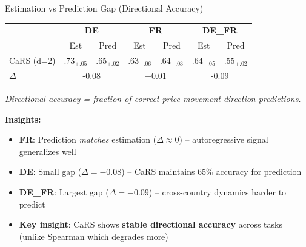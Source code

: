 \documentclass[aspectratio=169]{beamer}
\begin{document}
\begin{frame}{Estimation vs Prediction Gap (Directional Accuracy)}
\begin{table}
\centering
\small
\begin{tabular}{l|cc|cc|cc}
\toprule
& \multicolumn{2}{c|}{\textbf{DE}} & \multicolumn{2}{c|}{\textbf{FR}} & \multicolumn{2}{c}{\textbf{DE\_FR}} \\
& Est & Pred & Est & Pred & Est & Pred \\
\midrule
CaRS (d=2) & .73$_{\pm.05}$ & .65$_{\pm.02}$ & .63$_{\pm.06}$ & .64$_{\pm.03}$ & .64$_{\pm.05}$ & .55$_{\pm.02}$ \\
$\Delta$ & \multicolumn{2}{c|}{\textcolor{reprogreen}{-0.08}} & \multicolumn{2}{c|}{\textcolor{reprogreen}{+0.01}} & \multicolumn{2}{c|}{\textcolor{warnred}{-0.09}} \\
\bottomrule
\end{tabular}
\end{table}

\vspace{0.3cm}
{\scriptsize \textit{Directional accuracy = fraction of correct price movement direction predictions.}}

\vspace{0.2cm}
\textbf{Insights:}
\begin{itemize}
    \item \textbf{FR}: Prediction \textit{matches} estimation ($\Delta \approx 0$) -- autoregressive signal generalizes well
    \item \textbf{DE}: Small gap ($\Delta = -0.08$) -- CaRS maintains 65\% accuracy for prediction
    \item \textbf{DE\_FR}: Largest gap ($\Delta = -0.09$) -- cross-country dynamics harder to predict
    \item \textbf{Key insight}: CaRS shows \textbf{stable directional accuracy} across tasks (unlike Spearman which degrades more)
\end{itemize}
\end{frame}
\end{document}
